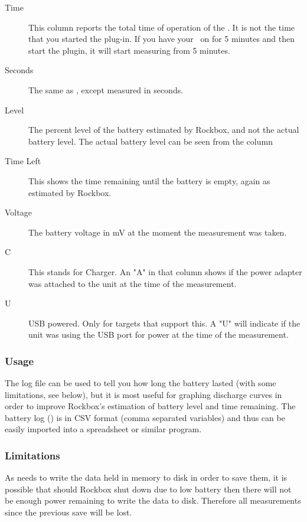 \begin{description}
\item[Time] This column reports the total time of operation of the \dap. It is 
not the time that you started the plug-in. If you have your \dap\ on for 5 
minutes and then start the plugin, it will start measuring from 5 minutes.
\item[Seconds] The same as , except measured in seconds.
\item[Level] The percent level of the battery estimated by Rockbox, and not the
actual battery level. The actual battery level can be seen from the
 column
\item[Time Left] This shows the time remaining until the battery is empty,
again as estimated by Rockbox.
\item[Voltage] The battery voltage in mV at the moment the measurement
was taken.
\item[C] This stands for Charger. An "A" in that column shows if the power
adapter was attached to the unit at the time of the measurement.
\item[U] USB powered. Only for targets that support this. A "U" will indicate
if the unit was using the USB port for power at the time of the measurement. 
\end{description}

\subsubsection{Usage}
The log file can be used to tell you how long the battery lasted (with some
limitations, see below), but it is most useful for graphing discharge curves
in order to improve Rockbox's estimation of battery level and time remaining.
The battery log () is in CSV format
(comma separated variables) and thus can be easily imported into a spreadsheet
or similar program.

\subsubsection{Limitations}
As  needs to write the data held in memory to
disk in order to save them, it is possible that should Rockbox shut down
due to low battery then there will not be enough power remaining to write the
data to disk. Therefore all measurements since the previous save will be lost.

